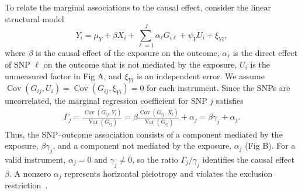 \noindent To relate the marginal associations to the causal effect, consider the linear structural model
\begin{equation*}
Y_i = \mu_Y + \beta X_i + \sum_{\ell=1}^{J}\alpha_\ell G_{i\ell} + \psi_Y U_i + \xi_{Yi},
\end{equation*}
where $\beta$ is the causal effect of the exposure on the outcome, $\alpha_\ell$ is the direct effect of SNP $\ell$ on the outcome that is not mediated by the exposure, $U_i$ is the unmeasured factor in Fig A, and $\xi_{Yi}$ is an independent error. We assume $\operatorname{Cov}(G_{ij},U_i)=\operatorname{Cov}(G_{ij},\xi_{Yi})=0$ for each instrument. Since the SNPs are uncorrelated, the marginal regression coefficient for SNP $j$ satisfies
\begin{equation*}
\begin{aligned}
\Gamma_j = \frac{\operatorname{Cov}(G_{ij},Y_i)}
         {\operatorname{Var}(G_{ij})} = \beta
   \frac{\operatorname{Cov}(G_{ij},X_i)}
        {\operatorname{Var}(G_{ij})}
   + \alpha_j  = \beta\gamma_j + \alpha_j.
\end{aligned}
\end{equation*}
Thus, the SNP--outcome association consists of a component mediated by the exposure, $\beta\gamma_j$, and a component not mediated by the exposure, $\alpha_j$ (Fig B). For a valid instrument, $\alpha_j=0$ and $\gamma_j\neq0$, so the ratio $\Gamma_j/\gamma_j$ identifies the causal effect $\beta$. A nonzero $\alpha_j$ represents horizontal pleiotropy and violates the exclusion restriction~\cite{burgess2017interpreting}.

